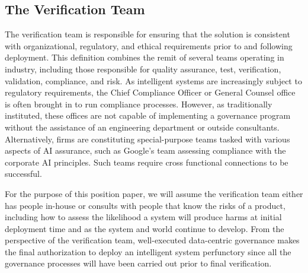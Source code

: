 \subsection{The Verification Team}


The verification team is responsible for ensuring that the solution is consistent with organizational, regulatory, and ethical requirements prior to and following deployment.
This definition combines the remit of several teams operating in industry, including those responsible for quality assurance, test, verification, validation, compliance, and risk. As intelligent systems are increasingly subject to regulatory requirements, the Chief Compliance Officer or General Counsel office is often brought in to run compliance processes. However, as traditionally instituted, these offices are not capable of implementing a governance program without the assistance of an engineering department or outside consultants. Alternatively, firms are constituting special-purpose teams tasked with various aspects of AI assurance, such as Google's team assessing compliance with the corporate AI principles. Such teams require cross functional connections to be successful.

For the purpose of this position paper, we will assume the verification team either has people in-house or consults with people that know the risks of a product, including how to assess the likelihood a system will produce harms at initial deployment time and as the system and world continue to develop. From the perspective of the verification team, well-executed data-centric governance makes the final authorization to deploy an intelligent system perfunctory since all the governance processes will have been carried out prior to final verification.

